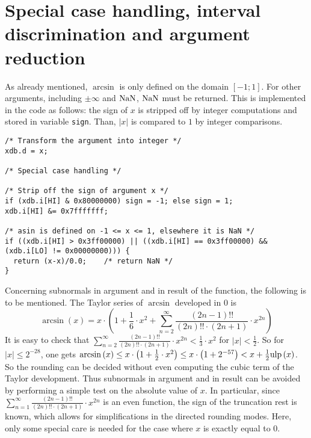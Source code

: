 \section{Special case handling, interval discrimination and argument reduction}\label{sec:asinargred}
As already mentioned, $\arcsin$ is only defined on the domain $\left[
  -1; 1 \right]$. For other arguments, including $\pm \infty$ and
$\mathrm{NaN}$, $\mathrm{NaN}$ must be returned. This is implemented in the code as
follows: the sign of $x$ is stripped off by integer computations and
stored in variable {\tt sign}. Than, $\left \vert x \right \vert$ is
compared to $1$ by integer comparisons.
\begin{lstlisting}[caption={Handling special cases - definition domain},firstnumber=1]
/* Transform the argument into integer */
xdb.d = x;

/* Special case handling */

/* Strip off the sign of argument x */
if (xdb.i[HI] & 0x80000000) sign = -1; else sign = 1;
xdb.i[HI] &= 0x7fffffff;

/* asin is defined on -1 <= x <= 1, elsewhere it is NaN */
if ((xdb.i[HI] > 0x3ff00000) || ((xdb.i[HI] == 0x3ff00000) && (xdb.i[LO] != 0x00000000))) {
  return (x-x)/0.0;    /* return NaN */
}
\end{lstlisting}

Concerning subnormals in argument and in result of the function, the
following is to be mentioned.  The Taylor series of $\arcsin$
developed in $0$ is $$\arcsin\left( x \right) = x \cdot \left( 1 +
\frac{1}{6} \cdot x^2 + \sum\limits_{n=2}^\infty \frac{\left( 2n - 1
\right)!!}{\left(2n\right)!! \cdot \left( 2n + 1 \right)} \cdot
x^{2n}\right)$$ It is easy to check that $\sum\limits_{n=2}^\infty
\frac{\left( 2n - 1 \right)!!}{\left(2n\right)!! \cdot \left( 2n + 1
\right)} \cdot x^{2n} < \frac{1}{3} \cdot x^2$ for $\left \vert x
\right \vert < \frac{1}{2}$. So for $\left \vert x \right \vert \leq
2^{-28}$, one gets $\arcsin\left( x \right) \leq x \cdot \left( 1 +
\frac{1}{2} \cdot x^2 \right) \leq x \cdot \left( 1 + 2^{-57} \right)
< x + \frac{1}{2} \mathrm{ulp}\left(x\right)$. So the rounding can be decided
without even computing the cubic term of the Taylor
development. Thus subnormals in argument and in result can be avoided
by performing a simple test on the absolute value of $x$. In
particular, since $\sum\limits_{n=1}^\infty \frac{\left( 2n - 1
\right)!!}{\left(2n\right)!! \cdot \left( 2n + 1 \right)} \cdot
x^{2n}$ is an even function, the sign of the truncation rest is known,
which allows for simplifications in the directed rounding modes. Here,
only some special care is needed for the case where $x$ is exactly
equal to $0$.  


